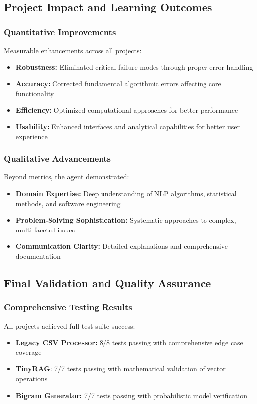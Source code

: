 \documentclass[12pt, a4paper]{article}
\begin{document}
\subsection{Project Impact and Learning Outcomes}

\subsubsection{Quantitative Improvements}
Measurable enhancements across all projects:
\begin{itemize}
    \item \textbf{Robustness:} Eliminated critical failure modes through proper error handling
    \item \textbf{Accuracy:} Corrected fundamental algorithmic errors affecting core functionality
    \item \textbf{Efficiency:} Optimized computational approaches for better performance
    \item \textbf{Usability:} Enhanced interfaces and analytical capabilities for better user experience
\end{itemize}

\subsubsection{Qualitative Advancements}
Beyond metrics, the agent demonstrated:
\begin{itemize}
    \item \textbf{Domain Expertise:} Deep understanding of NLP algorithms, statistical methods, and software engineering
    \item \textbf{Problem-Solving Sophistication:} Systematic approaches to complex, multi-faceted issues
    \item \textbf{Communication Clarity:} Detailed explanations and comprehensive documentation
\end{itemize}

\subsection{Final Validation and Quality Assurance}

\subsubsection{Comprehensive Testing Results}
All projects achieved full test suite success:
\begin{itemize}
    \item \textbf{Legacy CSV Processor:} 8/8 tests passing with comprehensive edge case coverage
    \item \textbf{TinyRAG:} 7/7 tests passing with mathematical validation of vector operations
    \item \textbf{Bigram Generator:} 7/7 tests passing with probabilistic model verification
\end{itemize}
\end{document}
